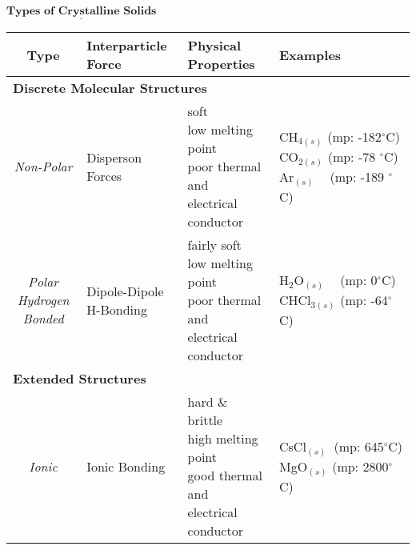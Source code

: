 \documentclass{article}
\begin{document}
		\newcommand{\Tstrutsolids}{\rule{0pt}{7ex}}         %
		\newcommand{\Bstrutsolids}{\rule[-7ex]{0pt}{0pt}}   %
		\newcommand{\TBstrutsolids}{\Tstrutsolids\Bstrutsolids} 
				\newcommand{\Tstrutsolidstwo}{\rule{0pt}{3ex}}         %
		\newcommand{\Bstrutsolidstwo}{\rule[-1.5ex]{0pt}{0pt}}   %
		\newcommand{\TBstrutsolidstwo}{\Tstrutsolidstwo\Bstrutsolidstwo} 
		\newcommand{\Tstrutsolidsthree}{\rule{0pt}{2.5ex}}         %
		\newcommand{\Bstrutsolidsthree}{\rule[-1ex]{0pt}{0pt}}   %
		\newcommand{\TBstrutsolidsthree}{\Tstrutsolidsthree\Bstrutsolidsthree} 
			\begin{qq}
			
			\begin{center}
				
				$\underline{\textbf{Types of Crystalline Solids}}$
				\vspace{3pt}
				
				\begin{tabular}{clll}
					\hline
					Type & Interparticle Force & Physical Properties & Examples \TBstrutsolidsthree\\
					\hline
					\multicolumn{4}{l}{\textbf{Discrete Molecular Structures}} \TBstrutsolidstwo\\
					\hline					
					 \textit{Non-Polar} & Disperson Forces &  \makecell[l]{soft \\ low melting point \\ poor thermal and \\ electrical conductor} & \makecell[l]{CH$_{4(s)}$ \textcolor{pag!60}{(mp: -182$^{\circ}$C)} \\ CO$_{2(s)}$ \textcolor{pag!60}{(mp: -78 $^{\circ}$C)} \\ Ar$_{(s)}$ $\:\:\:\:$\textcolor{pag!60}{(mp: -189 $^{\circ}$C)}} \TBstrutsolids \\
					 
					\makecell[c]{\textit{Polar} \\ \textit{Hydrogen Bonded}}& \makecell{Dipole-Dipole \\ H-Bonding} & \makecell[l]{fairly soft \\ low melting point \\ poor thermal and \\ electrical conductor} &  \makecell[l]{ H$_2$O$_{(s)}$ \textcolor{pag!60}{$\:\:\:\:$(mp: 0$^{\circ}$C)} \\ CHCl$_{3(s)}$ \textcolor{pag!60}{(mp: -64$^{\circ}$C)} }	\TBstrutsolids \\
					\hline
					\multicolumn{4}{l}{\textbf{Extended Structures}}\TBstrutsolidstwo\\
					\hline
					\textit{Ionic}& Ionic Bonding & \makecell[l]{hard \& brittle \\ high melting point\\ good thermal and \\ electrical conductor} &  \makecell[l]{ CsCl$_{(s)}$ $\:$\textcolor{pag!60}{(mp: 645$^{\circ}$C)} \\ MgO$_{(s)}$ \textcolor{pag!60}{(mp: 2800$^{\circ}$C)} }	\TBstrutsolids \\
					

\end{tabular}
\end{center}
\end{qq}
\end{document}
